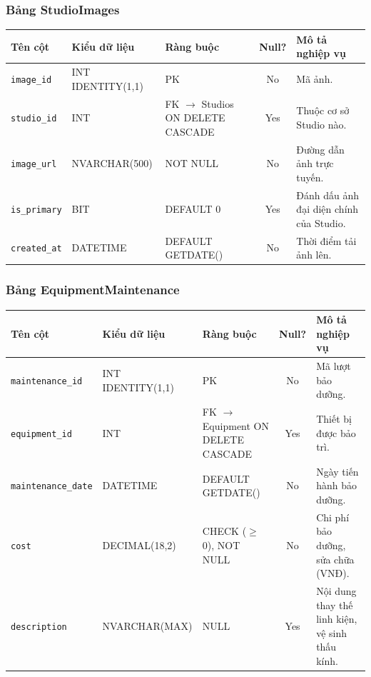 \subsubsection{Bảng StudioImages}
\begin{table}[H]
\centering
\small
\begin{tabularx}{\textwidth}{l l l c X}
\toprule
\textbf{Tên cột} & \textbf{Kiểu dữ liệu} & \textbf{Ràng buộc} & \textbf{Null?} & \textbf{Mô tả nghiệp vụ} \\
\midrule
\texttt{image\_id} & INT IDENTITY(1,1) & PK & No & Mã ảnh. \\
\texttt{studio\_id} & INT & FK $\rightarrow$ Studios ON DELETE CASCADE & Yes & Thuộc cơ sở Studio nào. \\
\texttt{image\_url} & NVARCHAR(500) & NOT NULL & No & Đường dẫn ảnh trực tuyến. \\
\texttt{is\_primary} & BIT & DEFAULT 0 & Yes & Đánh dấu ảnh đại diện chính của Studio. \\
\texttt{created\_at} & DATETIME & DEFAULT GETDATE() & No & Thời điểm tải ảnh lên. \\
\bottomrule
\end{tabularx}
\end{table}

\subsubsection{Bảng EquipmentMaintenance}
\begin{table}[H]
\centering
\small
\begin{tabularx}{\textwidth}{l l l c X}
\toprule
\textbf{Tên cột} & \textbf{Kiểu dữ liệu} & \textbf{Ràng buộc} & \textbf{Null?} & \textbf{Mô tả nghiệp vụ} \\
\midrule
\texttt{maintenance\_id}& INT IDENTITY(1,1) & PK & No & Mã lượt bảo dưỡng. \\
\texttt{equipment\_id} & INT & FK $\rightarrow$ Equipment ON DELETE CASCADE & Yes & Thiết bị được bảo trì. \\
\texttt{maintenance\_date}& DATETIME & DEFAULT GETDATE() & No & Ngày tiến hành bảo dưỡng. \\
\texttt{cost} & DECIMAL(18,2) & CHECK ($\ge$ 0), NOT NULL & No & Chi phí bảo dưỡng, sửa chữa (VNĐ). \\
\texttt{description} & NVARCHAR(MAX) & NULL & Yes & Nội dung thay thế linh kiện, vệ sinh thấu kính. \\
\bottomrule
\end{tabularx}
\end{table}


